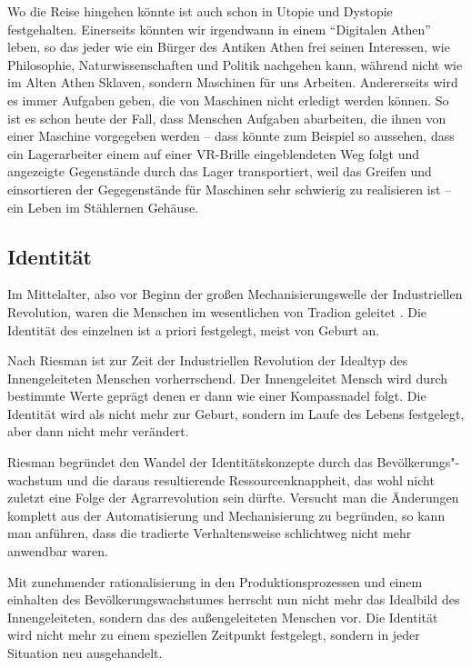 Wo die Reise hingehen könnte ist auch schon in Utopie und Dystopie festgehalten.
Einerseits könnten wir irgendwann in einem \enquote{Digitalen Athen} leben, so das jeder wie ein Bürger des Antiken Athen frei seinen Interessen, wie Philosophie, Naturwissenschaften und Politik nachgehen kann, während nicht wie im Alten Athen Sklaven, sondern Maschinen für uns Arbeiten.
Andererseits wird es immer Aufgaben geben, die von Maschinen nicht erledigt werden können.
So ist es schon heute der Fall, dass Menschen Aufgaben abarbeiten, die ihnen von einer Maschine vorgegeben werden – dass könnte zum Beispiel so aussehen, dass ein Lagerarbeiter einem auf einer VR-Brille eingeblendeten Weg folgt und angezeigte Gegenstände durch das Lager transportiert, weil das Greifen und einsortieren der Gegegenstände für Maschinen sehr schwierig zu realisieren ist – ein Leben im Stählernen Gehäuse.

\subsection{Identität}

Im Mittelalter, also vor Beginn der großen Mechanisierungswelle der Industriellen Revolution, waren die Menschen im wesentlichen von Tradion geleitet \parencite{riessman}.
Die Identität des einzelnen ist a priori festgelegt, meist von Geburt an\parencite{rosa}.

Nach Riesman ist zur Zeit der Industriellen Revolution der Idealtyp des Innengeleiteten Menschen vorherrschend. Der Innengeleitet Mensch wird durch bestimmte Werte geprägt denen er dann wie einer Kompassnadel folgt.
Die Identität wird als nicht mehr zur Geburt, sondern im Laufe des Lebens festgelegt, aber dann nicht mehr verändert.

Riesman begründet den Wandel der Identitätskonzepte durch das Bevölkerungs"-wachstum und die daraus resultierende Ressourcenknappheit, das wohl nicht zuletzt eine Folge der Agrarrevolution sein dürfte.
Versucht man die Änderungen komplett aus der Automatisierung und Mechanisierung zu begründen, so kann man anführen, dass die tradierte Verhaltensweise schlichtweg nicht mehr anwendbar waren. 

Mit zunehmender rationalisierung in den Produktionsprozessen und einem einhalten des Bevölkerungswachstumes herrscht nun nicht mehr das Idealbild des Innengeleiteten, sondern das des außengeleiteten Menschen vor.
Die Identität wird nicht mehr zu einem speziellen Zeitpunkt festgelegt, sondern in jeder Situation neu ausgehandelt.
